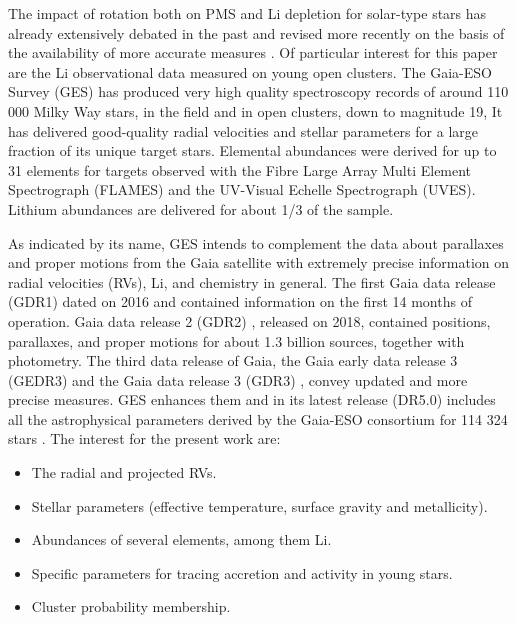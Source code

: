 \documentclass[fleqn,usenatbib]{mnras}
\begin{document}
The impact of rotation both on PMS and Li depletion for solar-type stars has already extensively debated in the past \citep{Pinsonneault1997,Jeffries2004,Somers2014} and revised more recently on the basis of the availability of more accurate measures \citep{Gallet2013,Bouvier2016, Bouvier2018, Franciosini2022}. Of particular interest for this paper are the Li observational data measured on young open clusters. The Gaia-ESO Survey (GES) \citep{Gilmore2012,Randich2013,Randich2022} has produced very high quality spectroscopy records of around 110 000 Milky Way stars, in the field and in open clusters, down to magnitude 19, It has delivered good-quality radial velocities and stellar parameters for a large fraction of its unique target stars. Elemental abundances were derived for up to 31 elements for targets observed with the Fibre Large Array Multi Element Spectrograph (FLAMES) and the UV-Visual Echelle Spectrograph (UVES). Lithium abundances are delivered for about 1/3 of the sample.\par

As indicated by its name, GES intends to complement the data about parallaxes and proper motions from the Gaia satellite \citep{Mignard2005} with extremely precise information on radial velocities (RVs), Li, and chemistry in general. The first Gaia data release (GDR1) \citep{Brown2016} dated on 2016 and contained information on the first 14 months of operation. Gaia data release 2 (GDR2) \citep{Brown2018}, released on 2018, contained positions, parallaxes, and proper motions for about 1.3 billion sources, together with photometry. The third data release of Gaia, the Gaia early data release 3 (GEDR3) \citep{Brown2021} and the Gaia data release 3 (GDR3) \citep{Brown2022}, convey updated and more precise measures. GES enhances them and in its latest release (DR5.0) includes all the astrophysical parameters derived by the Gaia-ESO consortium for 114 324 stars \citep{Gilmore2022}. The interest for the present work are:
\begin{itemize}
    \item The radial and projected RVs.
    \item Stellar parameters (effective temperature, surface gravity and metallicity).
    \item Abundances of several elements, among them Li.
    \item Specific parameters for tracing accretion and activity in young stars.
    \item Cluster probability membership.  
\end{itemize}
\end{document}
